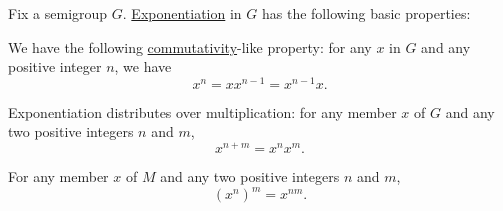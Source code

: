 \begin{proposition}\label{thm:semigroup_exponentiation_properties}
  Fix a semigroup \( G \). \hyperref[def:semigroup/exponentiation]{Exponentiation} in \( G \) has the following basic properties:

  \begin{thmenum}
     We have the following \hyperref[def:binary_operation/commutative]{commutativity}-like property: for any \( x \) in \( G \) and any positive integer \( n \), we have
    \begin{equation}\label{eq:thm:semigroup_exponentiation_properties/commutativity}
      x^n = x x^{n-1} = x^{n-1} x.
    \end{equation}

     Exponentiation distributes over multiplication: for any member \( x \) of \( G \) and any two positive integers \( n \) and \( m \),
    \begin{equation}\label{eq:thm:semigroup_exponentiation_properties/multiplication}
      x^{n + m} = x^n x^m.
    \end{equation}

     For any member \( x \) of \( M \) and any two positive integers \( n \) and \( m \),
    \begin{equation}\label{eq:thm:semigroup_exponentiation_properties/repeated}
      (x^n)^m = x^{nm}.
    \end{equation}
  \end{thmenum}
\end{proposition}
